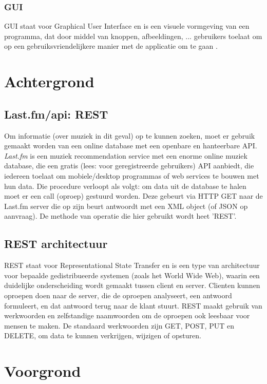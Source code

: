\documentclass[11pt,a4paper]{article}
\begin{document}
		\subsubsection{GUI}
		GUI staat voor Graphical User Interface en is een visuele vormgeving van een programma, dat door middel van knoppen, afbeeldingen, ... gebruikers toelaat om op een gebruiksvriendelijkere manier met de applicatie om te gaan .

\section{Achtergrond}
	\subsection{Last.fm/api: REST}
Om informatie (over muziek in dit geval) op te kunnen zoeken, moet er gebruik gemaakt worden van een online database met een openbare en hanteerbare API. \textit{Last.fm} is een muziek recommendation service met een enorme online muziek database, die  een gratis (lees: voor geregistreerde gebruikers) API aanbiedt, die iedereen toelaat om mobiele/desktop programmas of web services te bouwen met hun data.
\newline
Die procedure verloopt als volgt: om data uit de database te halen moet er een call (oproep) gestuurd worden. Deze gebeurt via HTTP GET naar de Last.fm server die op zijn beurt antwoordt met een XML object (of JSON op aanvraag). De methode van operatie die hier gebruikt wordt heet 'REST'. 
	\subsection{REST architectuur}
	REST staat voor Representational State Transfer en is een type van architectuur voor bepaalde gedistribueerde systemen (zoals het World Wide Web), waarin een duidelijke onderscheiding wordt gemaakt tussen client en server. Clienten kunnen oproepen doen naar de server, die de oproepen analyseert, een antwoord formuleert, en dat antwoord terug naar de klant stuurt. REST maakt gebruik van werkwoorden en zelfstandige naamwoorden om de oproepen ook leesbaar voor mensen te maken. De standaard werkwoorden zijn GET, POST, PUT en DELETE, om data te kunnen verkrijgen, wijzigen of opsturen.
	
\section{Voorgrond}
\end{document}
